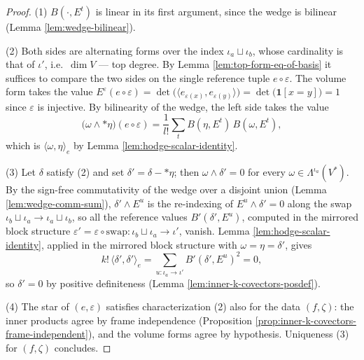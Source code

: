 \begin{proof}
\leanok
(1) $B(\cdot, E^t)$ is linear in its first argument, since the wedge is bilinear (Lemma \ref{lem:wedge-bilinear}).

(2) Both sides are alternating forms over the index $\iota_a \sqcup \iota_b$, whose cardinality is that of $\iota'$, i.e.\ $\dim V$ --- top degree. By Lemma \ref{lem:top-form-eq-of-basis} it suffices to compare the two sides on the single reference tuple $e \circ \varepsilon$. The volume form takes the value $E^\varepsilon(e \circ \varepsilon) = \det\big(\langle e_{\varepsilon(x)}, e_{\varepsilon(y)}\rangle\big) = \det\big(\mathbf{1}[x = y]\big) = 1$ since $\varepsilon$ is injective. By bilinearity of the wedge, the left side takes the value
\[
\big(\omega \wedge {*}\eta\big)(e \circ \varepsilon) = \frac{1}{l!} \sum_t B(\eta, E^t)\, B(\omega, E^t),
\]
which is $\langle \omega, \eta\rangle_e$ by Lemma \ref{lem:hodge-scalar-identity}.

(3) Let $\delta$ satisfy (2) and set $\delta' = \delta - {*}\eta$; then $\omega \wedge \delta' = 0$ for every $\omega \in \Lambda^{\iota_a}(V^*)$. By the sign-free commutativity of the wedge over a disjoint union (Lemma \ref{lem:wedge-comm-sum}), $\delta' \wedge E^u$ is the re-indexing of $E^u \wedge \delta' = 0$ along the swap $\iota_b \sqcup \iota_a \to \iota_a \sqcup \iota_b$, so all the reference values $B'(\delta', E^u)$, computed in the mirrored block structure $\varepsilon' = \varepsilon \circ \mathrm{swap} \colon \iota_b \sqcup \iota_a \to \iota'$, vanish. Lemma \ref{lem:hodge-scalar-identity}, applied in the mirrored block structure with $\omega = \eta = \delta'$, gives
\[
k!\, \langle \delta', \delta' \rangle_e = \sum_{u \colon \iota_a \to \iota'} B'(\delta', E^u)^2 = 0,
\]
so $\delta' = 0$ by positive definiteness (Lemma \ref{lem:inner-k-covectors-posdef}).

(4) The star of $(e, \varepsilon)$ satisfies characterization (2) also for the data $(f, \zeta)$: the inner products agree by frame independence (Proposition \ref{prop:inner-k-covectors-frame-independent}), and the volume forms agree by hypothesis. Uniqueness (3) for $(f, \zeta)$ concludes.
\end{proof}

